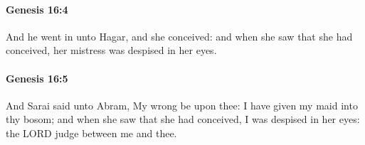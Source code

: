 		\paragraph{Genesis 16:4} %
			\label{GENESIS-16-4}

			And he went in unto Hagar, and she conceived: and when she saw that she had conceived, her mistress was despised in her eyes.


		\paragraph{Genesis 16:5} %
			\label{GENESIS-16-5}

			And Sarai said unto Abram, My wrong be upon thee: I have given my maid into thy bosom; and when she saw that she had conceived, I was despised in her eyes: the LORD judge between me and thee.


